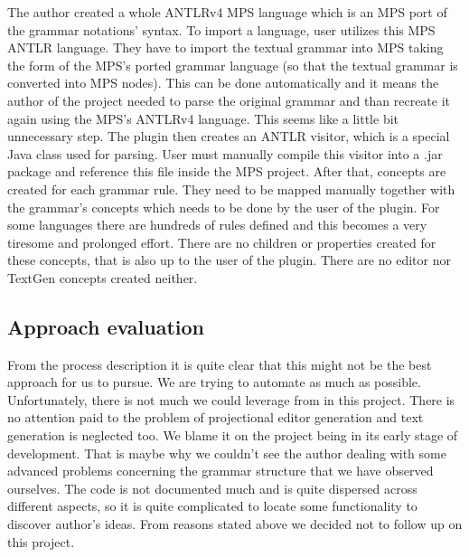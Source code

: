 The author created a whole ANTLRv4 MPS language which is an MPS port of the grammar notations' syntax.
To import a language, user utilizes this MPS ANTLR language.
They have to import the textual grammar into MPS taking the form of the MPS's ported grammar language (so that the textual grammar is converted into MPS nodes).
This can be done automatically and it means the author of the project needed to parse the original grammar and than recreate it again using the MPS's ANTLRv4 language.
This seems like a little bit unnecessary step.
The plugin then creates an ANTLR visitor, which is a special Java class used for parsing.
User must manually compile this visitor into a .jar package and reference this file inside the MPS project.
After that, concepts are created for each grammar rule.
They need to be mapped manually together with the grammar's concepts which needs to be done by the user of the plugin.
For some languages there are hundreds of rules defined and this becomes a very tiresome and prolonged effort.
There are no children or properties created for these concepts, that is also up to the user of the plugin.
There are no editor nor TextGen concepts created neither.

\subsection{Approach evaluation}
From the process description it is quite clear that this might not be the best approach for us to pursue.
We are trying to automate as much as possible.
Unfortunately, there is not much we could leverage from in this project.
There is no attention paid to the problem of projectional editor generation and text generation is neglected too.
We blame it on the project being in its early stage of development.
That is maybe why we couldn't see the author dealing with some advanced problems concerning the grammar structure that we have observed ourselves.
The code is not documented much and is quite dispersed across different aspects, so it is quite complicated to locate some functionality to discover author's ideas.
From reasons stated above we decided not to follow up on this project.
